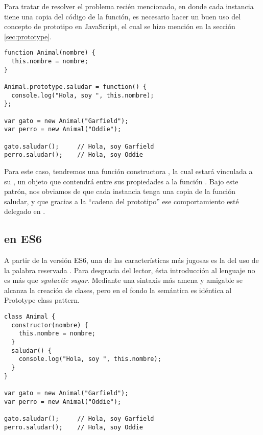 Para tratar de resolver el problema recién mencionado, en donde cada instancia tiene una copia del código de la función, es necesario hacer un buen uso del concepto de prototipo en JavaScript, el cual se hizo mención en la sección \ref{sec:prototype}.

\begin{lstlisting}[title={Prototype class pattern}]
function Animal(nombre) {
  this.nombre = nombre;
}

Animal.prototype.saludar = function() {
  console.log("Hola, soy ", this.nombre);
};

var gato = new Animal("Garfield");
var perro = new Animal("Oddie");

gato.saludar(); 	// Hola, soy Garfield
perro.saludar(); 	// Hola, soy Oddie
\end{lstlisting}

Para este caso, tendremos una función constructora , la cual estará vinculada a su \code{[[Prototype]]}, un objeto que contendrá entre sus propiedades a la función . Bajo este patrón, nos obviamos de que cada instancia tenga una copia de la función saludar, y que gracias a la "`cadena del prototipo"' ese comportamiento esté delegado en .

\subsection{ en ES6}
\label{clasesenes6}

A partir de la versión ES6, una de las características más jugosas es la del uso de la palabra reservada . Para desgracia del lector, ésta introducción al lenguaje no es más que \textit{syntactic sugar}. Mediante una sintaxis más amena y amigable se alcanza la creación de clases, pero en el fondo la semántica es idéntica al Prototype class pattern.

\begin{lstlisting}[title={Ejemplo de \code{class}}]
class Animal {
  constructor(nombre) {
    this.nombre = nombre;
  }
  saludar() {
    console.log("Hola, soy ", this.nombre);
  }
}

var gato = new Animal("Garfield");
var perro = new Animal("Oddie");

gato.saludar(); 	// Hola, soy Garfield
perro.saludar(); 	// Hola, soy Oddie
\end{lstlisting}
